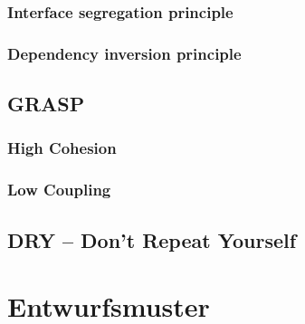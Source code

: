\documentclass[12pt,a4paper,titlepage,ngerman,pdftex]{report}
\begin{document}
    \subsubsection{Interface segregation principle}

    \subsubsection{Dependency inversion principle}

    \subsection{GRASP}

    \subsubsection{High Cohesion}

    \subsubsection{Low Coupling}
    
    \subsection{DRY -- Don't Repeat Yourself}

    \section{Entwurfsmuster}\label{sec:entwurfsmuster}
\end{document}

